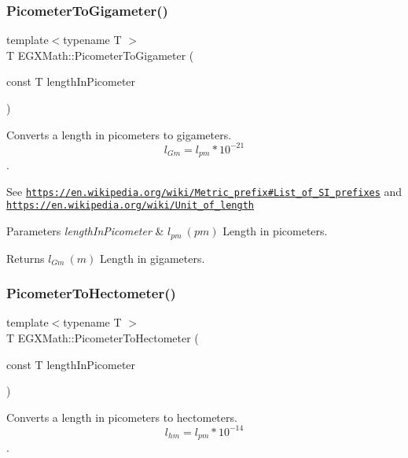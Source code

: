 \subsubsection{\texorpdfstring{Picometer\+To\+Gigameter()}{PicometerToGigameter()}}
{\footnotesize\ttfamily template$<$typename T $>$ \\
T E\+G\+X\+Math\+::\+Picometer\+To\+Gigameter (\begin{DoxyParamCaption}\item[{const T}]{length\+In\+Picometer }\end{DoxyParamCaption})}



Converts a length in picometers to gigameters. \[ l_{Gm}=l_{pm} * 10^{-21} \]. 

See \href{https://en.wikipedia.org/wiki/Metric_prefix#List_of_SI_prefixes}{\tt https\+://en.\+wikipedia.\+org/wiki/\+Metric\+\_\+prefix\#\+List\+\_\+of\+\_\+\+S\+I\+\_\+prefixes} and \href{https://en.wikipedia.org/wiki/Unit_of_length}{\tt https\+://en.\+wikipedia.\+org/wiki/\+Unit\+\_\+of\+\_\+length} 
\begin{DoxyParams}{Parameters}
{\em length\+In\+Picometer} & $ l_{pm}\ (pm)$ Length in picometers. \\
\hline
\end{DoxyParams}
\begin{DoxyReturn}{Returns}
$ l_{Gm}\ (m)$ Length in gigameters. 
\end{DoxyReturn}
\mbox{\label{group___e_g_x_math-_conversions-_length_conversions-_picometer-_s_i_ga51eebefd8810385585aa33ca80ac6e93}} 
\subsubsection{\texorpdfstring{Picometer\+To\+Hectometer()}{PicometerToHectometer()}}
{\footnotesize\ttfamily template$<$typename T $>$ \\
T E\+G\+X\+Math\+::\+Picometer\+To\+Hectometer (\begin{DoxyParamCaption}\item[{const T}]{length\+In\+Picometer }\end{DoxyParamCaption})}



Converts a length in picometers to hectometers. \[ l_{hm}=l_{pm} * 10^{-14} \]. 

